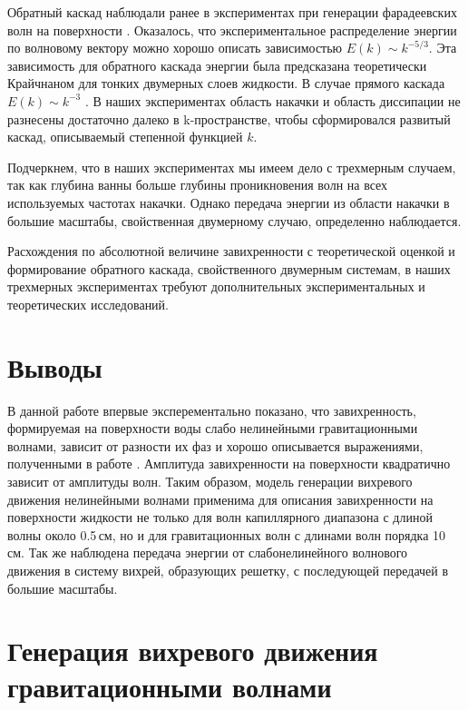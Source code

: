 Обратный каскад наблюдали ранее в экспериментах при генерации фарадеевских волн на поверхности \cite{fran}. Оказалось, что экспериментальное распределение энергии по волновому вектору можно хорошо описать зависимостью $E(k) \sim k^{-5/3}$. Эта зависимость для обратного каскада энергии была предсказана теоретически Крайчнаном \cite{krai} для тонких двумерных слоев жидкости. В случае прямого каскада $E(k) \sim k^{-3}$ \cite{krai}. В наших экспериментах область накачки и область диссипации не разнесены достаточно далеко в k-пространстве, чтобы сформировался развитый каскад, описываемый степенной функцией $k$.

Подчеркнем, что в наших экспериментах мы имеем дело с трехмерным случаем, так как глубина ванны больше глубины проникновения волн на всех используемых частотах накачки. Однако передача энергии из области накачки в большие масштабы, свойственная двумерному случаю, определенно наблюдается. 

Расхождения по абсолютной величине завихренности с теоретической оценкой и формирование обратного каскада, свойственного двумерным системам, в наших трехмерных экспериментах требуют дополнительных экспериментальных и теоретических исследований.

\section{Выводы} \label{sect4_5}
В данной работе впервые эксперементально показано, что завихренность, формируемая на поверхности воды слабо нелинейными гравитационными волнами, зависит от разности их фаз и хорошо описывается выражениями, полученными в работе \cite{parf}. Амплитуда завихренности на поверхности квадратично зависит от амплитуды волн. Таким образом, модель генерации вихревого движения нелинейными волнами применима для описания завихренности на поверхности жидкости не только для волн капиллярного диапазона с длиной волны около 0.5\,см, но и для гравитационных волн с длинами волн порядка 10\,см. Так же наблюдена передача энергии от слабонелинейного волнового движения в систему вихрей, образующих решетку, с последующей передачей в большие масштабы.


\section{Генерация вихревого движения гравитационными волнами} \label{sect4_3}

\clearpage